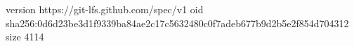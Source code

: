 version https://git-lfs.github.com/spec/v1
oid sha256:0d6d23be3d1f9339ba84ae2c17c5632480c0f7adeb677b9d2b5e2f854d704312
size 4114

